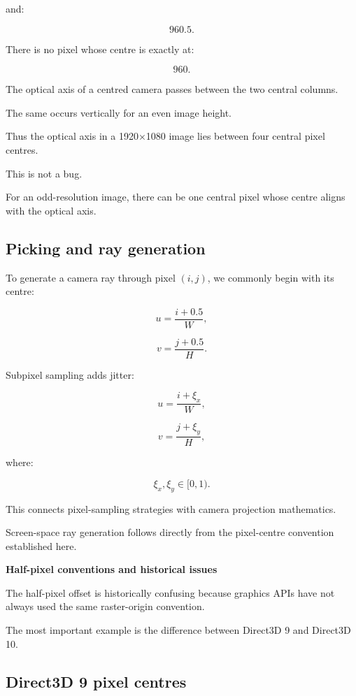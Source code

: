 and:

\[
 960.5.
\]

There is no pixel whose centre is exactly at:

\[
 960.
\]

The optical axis of a centred camera passes between the two central columns.

The same occurs vertically for an even image height.

Thus the optical axis in a 1920×1080 image lies between four central pixel centres.

This is not a bug.

For an odd-resolution image, there can be one central pixel whose centre aligns with the optical axis.

\subsection{Picking and ray generation}\label{02-foundations-ii-ch033-picking-and-ray-generation}

To generate a camera ray through pixel \((i,j)\), we commonly begin with its centre:

\[
 u=\frac{i+0.5}{W},
\]

\[
 v=\frac{j+0.5}{H}.
\]

Subpixel sampling adds jitter:

\[
 u=\frac{i+\xi_x}{W},
\]

\[
 v=\frac{j+\xi_y}{H},
\]

where:

\[
 \xi_x,\xi_y\in[0,1).
\]

This connects pixel-sampling strategies with camera projection mathematics.

Screen-space ray generation follows directly from the pixel-centre convention established here.

\textbf{Half-pixel conventions and historical issues}

The half-pixel offset is historically confusing because graphics APIs have not always used the same raster-origin convention.

The most important example is the difference between Direct3D 9 and Direct3D 10.

\subsection{Direct3D 9 pixel centres}\label{02-foundations-ii-ch033-direct3d-9-pixel-centres}

